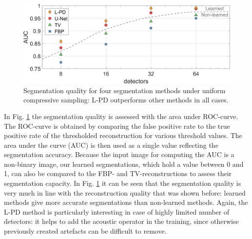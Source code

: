 \documentclass[journal]{IEEEtran}
\begin{document}
\begin{figure}[ht!]
\centering
\includegraphics[width=\linewidth]{images/Paper_resultsuniform_AUC.png}
\caption{Segmentation quality for four segmentation methods under uniform compressive sampling: L-PD outperforms other methods in all cases.}
\label{fig:AUC_recon}
\end{figure}

In Fig. \ref{fig:AUC_recon} the segmentation quality is assessed with the area under ROC-curve. The ROC-curve is obtained by comparing the false positive rate to the true positive rate of the thresholded reconstruction for various threshold values. The area under the curve (AUC) is then used as a single value reflecting the segmentation accuracy. Because the input image for computing the AUC is a non-binary image, our learned segmentations, which hold a value between 0 and 1, can also be compared to the FBP- and TV-reconstructions to assess their segmentation capacity. In Fig. \ref{fig:AUC_recon} it can be seen that the segmentation quality is very much in line with the reconstruction quality that was shown before: learned methods give more accurate segmentations than non-learned methods. Again, the L-PD method is particularly interesting in case of highly limited number of detectors: it helps to add the acoustic operator in the training, since otherwise previously created artefacts can be difficult to remove.
\end{document}
